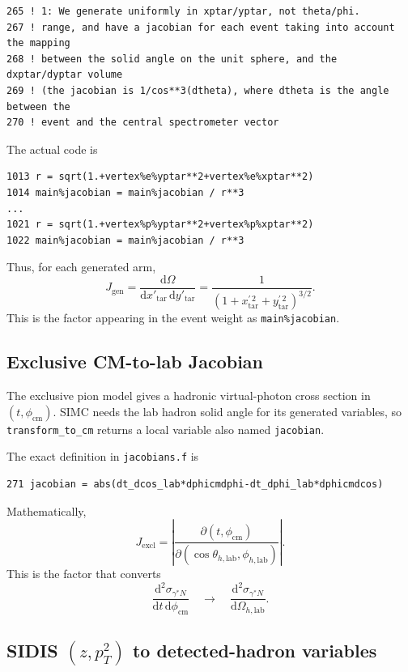 \documentclass[11pt]{article}
\newcommand{\dd}{\mathrm{d}}
\newcommand{\phicm}{\phi_{\mathrm{cm}}}
\begin{document}
\begin{lstlisting}
265 ! 1: We generate uniformly in xptar/yptar, not theta/phi.
267 ! range, and have a jacobian for each event taking into account the mapping
268 ! between the solid angle on the unit sphere, and the dxptar/dyptar volume
269 ! (the jacobian is 1/cos**3(dtheta), where dtheta is the angle between the
270 ! event and the central spectrometer vector
\end{lstlisting}

The actual code is
\begin{lstlisting}
1013 r = sqrt(1.+vertex%e%yptar**2+vertex%e%xptar**2)
1014 main%jacobian = main%jacobian / r**3
...
1021 r = sqrt(1.+vertex%p%yptar**2+vertex%p%xptar**2)
1022 main%jacobian = main%jacobian / r**3
\end{lstlisting}

Thus, for each generated arm,
\[
  J_{\mathrm{gen}}
  =
  \frac{\dd\Omega}{\dd x'_{\mathrm{tar}}\,\dd y'_{\mathrm{tar}}}
  =
  \frac{1}
       {\left(1+x_{\mathrm{tar}}^{\prime\,2}
                +y_{\mathrm{tar}}^{\prime\,2}\right)^{3/2}}.
\]
This is the factor appearing in the event weight as \texttt{main\%jacobian}.

\subsection{Exclusive CM-to-lab Jacobian}

The exclusive pion model gives a hadronic virtual-photon cross section in
\((t,\phicm)\).  SIMC needs the lab hadron solid angle for its generated
variables, so \texttt{transform\_to\_cm} returns a local variable also named
\texttt{jacobian}.

The exact definition in \texttt{jacobians.f} is
\begin{lstlisting}
271 jacobian = abs(dt_dcos_lab*dphicmdphi-dt_dphi_lab*dphicmdcos)
\end{lstlisting}

Mathematically,
\[
  J_{\mathrm{excl}}
  =
  \left|
  \frac{\partial(t,\phicm)}
       {\partial(\cos\theta_{h,\mathrm{lab}},\phi_{h,\mathrm{lab}})}
  \right|.
\]
This is the factor that converts
\[
  \frac{\dd^2\sigma_{\gamma^*N}}{\dd t\,\dd\phicm}
  \quad\longrightarrow\quad
  \frac{\dd^2\sigma_{\gamma^*N}}{\dd\Omega_{h,\mathrm{lab}}}.
\]

\subsection{SIDIS \((z,p_T^2)\) to detected-hadron variables}
\end{document}
